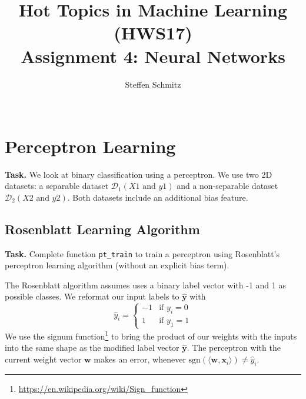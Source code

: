 \documentclass{support/acm_proc_article-sp}
\begin{document}
    \title{Hot Topics in Machine Learning (HWS17) \\ Assignment 4: Neural Networks}

    \author{
    \alignauthor
    Steffen Schmitz\\
    \\
    }

    \maketitle


    \section{Perceptron Learning}

    \textbf{Task.} We look at binary classification using a perceptron.
    We use two 2D datasets: a separable dataset $\mathcal{D}_1 (X1 \mbox{ and } y1)$ and a non-separable dataset $\mathcal{D}_2 (X2 \mbox{ and } y2)$.
    Both datasets include an additional bias feature.


    \subsection{Rosenblatt Learning Algorithm}
    \label{sec:rosenblatt}

    \textbf{Task.} Complete function \lstinline{pt_train} to train a perceptron using Rosenblatt's perceptron learning
    algorithm (without an explicit bias term).

    The Rosenblatt algorithm assumes uses a binary label vector with -1 and 1 as possible classes.
    We reformat our input labels to $\mathbf{\hat{y}}$ with
    \begin{equation*}
        \hat{y}_i =
        \begin{cases}
            -1 & \text{if } y_i = 0 \\
            1 & \text{if } y_1 = 1
        \end{cases}
    \end{equation*}
    We use the signum function\footnote{\href{https://en.wikipedia.org/wiki/Sign_function}{https://en.wikipedia.org/wiki/Sign\_function}}
    to bring the product of our weights with the inputs into the same shape as the modified label vector $\mathbf{\hat{y}}$.
    The perceptron with the current weight vector $\mathbf{w}$ makes an error, whenever
    $\mbox{sgn}(\langle\mathbf{w}, \mathbf{x}_i \rangle) \neq \hat{y}_i$.
\end{document}
